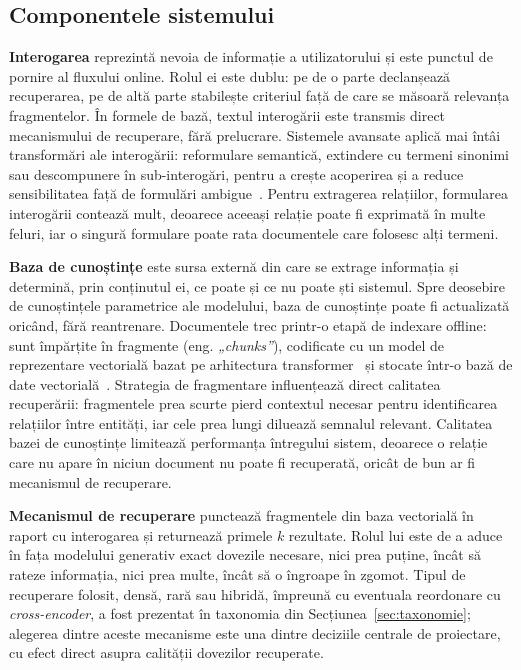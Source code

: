 \subsection{Componentele sistemului}

\textbf{Interogarea} reprezintă nevoia de informație a utilizatorului și este punctul de pornire al fluxului online. Rolul ei este dublu: pe de o parte declanșează recuperarea, pe de altă parte stabilește criteriul față de care se măsoară relevanța fragmentelor. În formele de bază, textul interogării este transmis direct mecanismului de recuperare, fără prelucrare. Sistemele avansate aplică mai întâi transformări ale interogării: reformulare semantică, extindere cu termeni sinonimi sau descompunere în sub-interogări, pentru a crește acoperirea și a reduce sensibilitatea față de formulări ambigue~\cite{gao2024retrievalaugmentedgenerationlargelanguage}. Pentru extragerea relațiilor, formularea interogării contează mult, deoarece aceeași relație poate fi exprimată în multe feluri, iar o singură formulare poate rata documentele care folosesc alți termeni.

\textbf{Baza de cunoștințe} este sursa externă din care se extrage informația și determină, prin conținutul ei, ce poate și ce nu poate ști sistemul. Spre deosebire de cunoștințele parametrice ale modelului, baza de cunoștințe poate fi actualizată oricând, fără reantrenare. Documentele trec printr-o etapă de indexare offline: sunt împărțite în fragmente (eng. \textit{„chunks”}), codificate cu un model de reprezentare vectorială bazat pe arhitectura transformer~\cite{vaswani2017attention} și stocate într-o bază de date vectorială~\cite{karpukhin2020dpr}. Strategia de fragmentare influențează direct calitatea recuperării: fragmentele prea scurte pierd contextul necesar pentru identificarea relațiilor între entități, iar cele prea lungi diluează semnalul relevant. Calitatea bazei de cunoștințe limitează performanța întregului sistem, deoarece o relație care nu apare în niciun document nu poate fi recuperată, oricât de bun ar fi mecanismul de recuperare.

\textbf{Mecanismul de recuperare} punctează fragmentele din baza vectorială în raport cu interogarea și returnează primele $k$ rezultate. Rolul lui este de a aduce în fața modelului generativ exact dovezile necesare, nici prea puține, încât să rateze informația, nici prea multe, încât să o îngroape în zgomot. Tipul de recuperare folosit, densă, rară sau hibridă, împreună cu eventuala reordonare cu \textit{cross-encoder}, a fost prezentat în taxonomia din Secțiunea~\ref{sec:taxonomie}; alegerea dintre aceste mecanisme este una dintre deciziile centrale de proiectare, cu efect direct asupra calității dovezilor recuperate.

